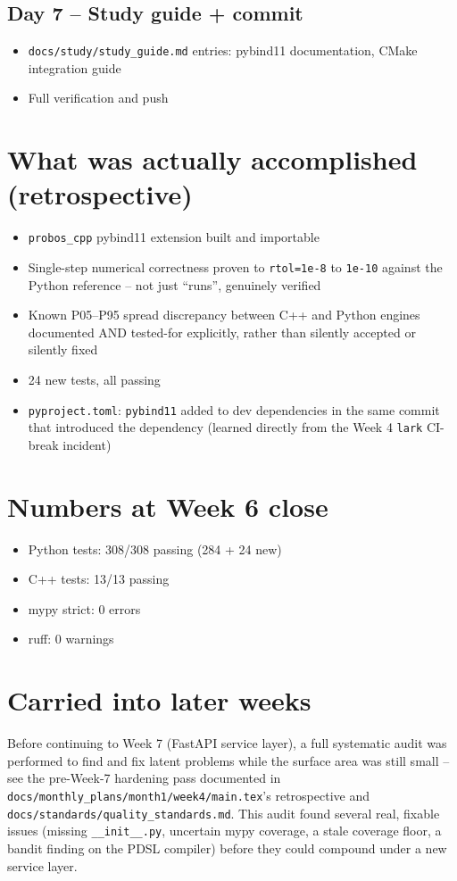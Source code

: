 \documentclass[11pt]{article}
\begin{document}
\subsection*{Day 7 -- Study guide + commit}
\begin{itemize}[leftmargin=*]
  \item \texttt{docs/study/study\_guide.md} entries: pybind11
    documentation, CMake integration guide
  \item Full verification and push
\end{itemize}

\section*{What was actually accomplished (retrospective)}

\begin{itemize}[leftmargin=*]
  \item \texttt{probos\_cpp} pybind11 extension built and importable
  \item Single-step numerical correctness proven to \texttt{rtol=1e-8}
    to \texttt{1e-10} against the Python reference -- not just
    ``runs'', genuinely verified
  \item Known P05--P95 spread discrepancy between C++ and Python
    engines documented AND tested-for explicitly, rather than silently
    accepted or silently fixed
  \item 24 new tests, all passing
  \item \texttt{pyproject.toml}: \texttt{pybind11} added to dev
    dependencies in the same commit that introduced the dependency
    (learned directly from the Week 4 \texttt{lark} CI-break incident)
\end{itemize}

\section*{Numbers at Week 6 close}
\begin{itemize}[leftmargin=*]
  \item Python tests: 308/308 passing (284 + 24 new)
  \item C++ tests: 13/13 passing
  \item mypy strict: 0 errors
  \item ruff: 0 warnings
\end{itemize}

\section*{Carried into later weeks}
Before continuing to Week 7 (FastAPI service layer), a full systematic
audit was performed to find and fix latent problems while the surface
area was still small -- see the pre-Week-7 hardening pass documented
in \texttt{docs/monthly\_plans/month1/week4/main.tex}'s retrospective
and \texttt{docs/standards/quality\_standards.md}. This audit found
several real, fixable issues (missing \texttt{\_\_init\_\_.py},
uncertain mypy coverage, a stale coverage floor, a bandit finding on
the PDSL compiler) before they could compound under a new service
layer.
\end{document}
